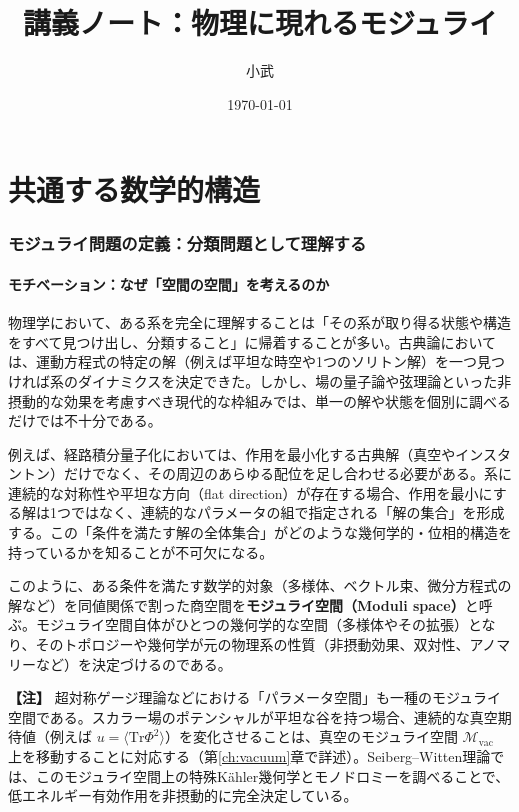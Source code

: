 \documentclass[uplatex, dvipdfmx, book]{jsbook}
\title{講義ノート：物理に現れるモジュライ}
\author{小武}
\date{\today}
\let\origsection\section
\let\origsubsection\subsection
\let\origsubsubsection\subsubsection
\newcommand{\chapter}{\origsection}
\renewcommand{\section}{\origsubsection}
\renewcommand{\subsection}{\origsubsubsection}
\renewcommand{\subsubsection}{\paragraph}
\newenvironment{note}{\vspace{1ex}\par\footnotesize\noindent\textbf{【注】}}{\par\vspace{1ex}}
\begin{document}
\maketitle
\tableofcontents

\part{共通する数学的構造}

\chapter{モジュライ問題の定義：分類問題として理解する}
\label{ch:intro}

\section{モチベーション：なぜ「空間の空間」を考えるのか}

物理学において、ある系を完全に理解することは「その系が取り得る状態や構造をすべて見つけ出し、分類すること」に帰着することが多い。古典論においては、運動方程式の特定の解（例えば平坦な時空や1つのソリトン解）を一つ見つければ系のダイナミクスを決定できた。しかし、場の量子論や弦理論といった非摂動的な効果を考慮すべき現代的な枠組みでは、単一の解や状態を個別に調べるだけでは不十分である。

例えば、経路積分量子化においては、作用を最小化する古典解（真空やインスタントン）だけでなく、その周辺のあらゆる配位を足し合わせる必要がある。系に連続的な対称性や平坦な方向（flat direction）が存在する場合、作用を最小にする解は1つではなく、連続的なパラメータの組で指定される「解の集合」を形成する。この「条件を満たす解の全体集合」がどのような幾何学的・位相的構造を持っているかを知ることが不可欠になる。

このように、ある条件を満たす数学的対象（多様体、ベクトル束、微分方程式の解など）を同値関係で割った商空間を\textbf{モジュライ空間（Moduli space）}と呼ぶ。モジュライ空間自体がひとつの幾何学的な空間（多様体やその拡張）となり、そのトポロジーや幾何学が元の物理系の性質（非摂動効果、双対性、アノマリーなど）を決定づけるのである。

\begin{note}
超対称ゲージ理論などにおける「パラメータ空間」も一種のモジュライ空間である。スカラー場のポテンシャルが平坦な谷を持つ場合、連続的な真空期待値（例えば $u = \langle \mathrm{Tr}\Phi^2 \rangle$）を変化させることは、真空のモジュライ空間 $\mathcal{M}_{\text{vac}}$ 上を移動することに対応する（第\ref{ch:vacuum}章で詳述）。Seiberg--Witten理論\cite{seibergwitten1994}では、このモジュライ空間上の特殊K\"ahler幾何学とモノドロミーを調べることで、低エネルギー有効作用を非摂動的に完全決定している。
\end{note}
\end{document}

